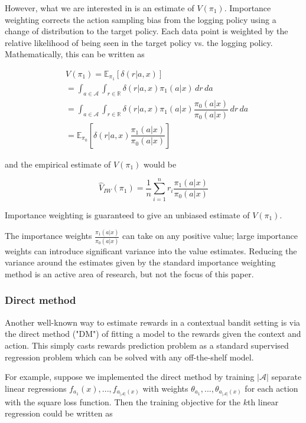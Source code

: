 \documentclass[sigplan,screen]{acmart}
\begin{document}
However, what we are interested in is an estimate of $V(\pi_1)$. Importance weighting corrects the action sampling bias from the logging policy using a change of distribution to the target policy. Each data point is weighted by the relative likelihood of being seen in the target policy vs. the logging policy. Mathematically, this can be written as 

\begin{align}
    &V(\pi_1) = \mathbb{E}_{\pi_1}[\delta(r|a,x)] \\ 
    &= \int_{a \in \mathcal{A}} \int_{r \in \mathbb{R}} \delta(r|a,x) \pi_1(a|x) \, dr \, da  \\ 
    &= \int_{a \in \mathcal{A}} \int_{r \in \mathbb{R}} \delta(r|a,x) \pi_1(a|x) \dfrac{\pi_0(a|x)}{\pi_0(a|x)} \, dr \, da \\
    &= \mathbb{E}_{\pi_0}[\delta(r|a,x) \dfrac{\pi_1(a|x)}{\pi_0(a|x)}]
\end{align}

and the empirical estimate of $V(\pi_1)$ would be 

\begin{equation}
    \hat{V}_{IW}(\pi_1) = \dfrac{1}{n} \sum_{i=1}^n r_i \dfrac{\pi_1(a|x)}{\pi_0(a|x)}
\end{equation}

Importance weighting is guaranteed to give an unbiased estimate of $V(\pi_1)$.

The importance weights $\frac{\pi_1(a|x)}{\pi_0(a|x)}$ can take on any positive value; large importance weights can introduce significant variance into the value estimates. Reducing the variance around the estimates given by the standard importance weighting method is an active area of research, but not the focus of this paper.

\subsubsection{Direct method}
Another well-known way to estimate rewards in a contextual bandit setting is via the direct method ("DM") of fitting a model to the rewards given the context and action. This simply casts rewards prediction problem as a standard supervised regression problem which can be solved with any off-the-shelf model.

For example, suppose we implemented the direct method by training $|\mathcal{A}|$ separate linear regressions $f_{a_1}(x), ..., f_{a_{|\mathcal{A}|}(x)}$ with weights $\theta_{a_1}, ..., \theta_{a_{|\mathcal{A}|}(x)}$ for each action with the square loss function. Then the training objective for the $k$th linear regression could be written as 
\end{document}
